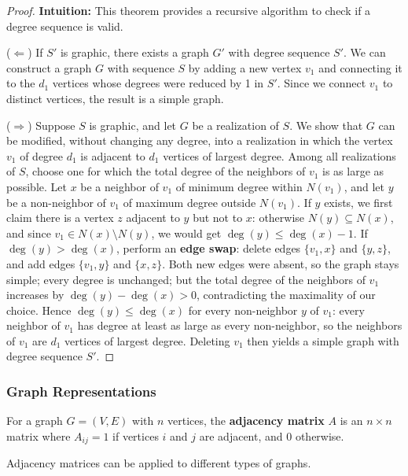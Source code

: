 \begin{proof}
\textbf{Intuition:} This theorem provides a recursive algorithm to check if a degree sequence is valid.

($\Leftarrow$) If $S'$ is graphic, there exists a graph $G'$ with degree sequence $S'$. We can construct a graph $G$ with sequence $S$ by adding a new vertex $v_1$ and connecting it to the $d_1$ vertices whose degrees were reduced by 1 in $S'$. Since we connect $v_1$ to distinct vertices, the result is a simple graph.

($\Rightarrow$) Suppose $S$ is graphic, and let $G$ be a realization of $S$. We show that $G$ can be modified, without changing any degree, into a realization in which the vertex $v_1$ of degree $d_1$ is adjacent to $d_1$ vertices of largest degree. Among all realizations of $S$, choose one for which the total degree of the neighbors of $v_1$ is as large as possible.
Let $x$ be a neighbor of $v_1$ of minimum degree within $N(v_1)$, and let $y$ be a non-neighbor of $v_1$ of maximum degree outside $N(v_1)$. If $y$ exists, we first claim there is a vertex $z$ adjacent to $y$ but not to $x$: otherwise $N(y) \subseteq N(x)$, and since $v_1 \in N(x) \setminus N(y)$, we would get $\deg(y) \le \deg(x) - 1$.
If $\deg(y) > \deg(x)$, perform an \textbf{edge swap}: delete edges $\{v_1, x\}$ and $\{y, z\}$, and add edges $\{v_1, y\}$ and $\{x, z\}$. Both new edges were absent, so the graph stays simple; every degree is unchanged; but the total degree of the neighbors of $v_1$ increases by $\deg(y) - \deg(x) > 0$, contradicting the maximality of our choice. Hence $\deg(y) \le \deg(x)$ for every non-neighbor $y$ of $v_1$: every neighbor of $v_1$ has degree at least as large as every non-neighbor, so the neighbors of $v_1$ are $d_1$ vertices of largest degree. Deleting $v_1$ then yields a simple graph with degree sequence $S'$.
\end{proof}

\subsubsection{Graph Representations}

\begin{definition}
For a graph $G = (V, E)$ with $n$ vertices, the \textbf{adjacency matrix} $A$ is an $n \times n$ matrix where $A_{ij} = 1$ if vertices $i$ and $j$ are adjacent, and $0$ otherwise.
\end{definition}

Adjacency matrices can be applied to different types of graphs.


